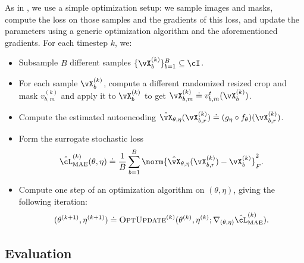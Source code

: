 \documentclass[../../book-main.tex]{subfiles}
\begin{document}
As in , we use a simple
optimization setup: we sample images and masks, compute the loss on
those samples and the gradients of this loss, and update the
parameters using a generic optimization algorithm and the
aforementioned gradients. For each timestep \(k\), we:
\begin{itemize}
\item Subsample \(B\) different samples \(\{\vX_{b}^{(k)}\}_{b =
    1}^{B} \subseteq \cI\).
\item For each sample \(\vX_{b}^{(k)}\), compute a different
    randomized resized crop and mask \(v_{b, m}^{(k)}\) and apply it
    to \(\vX_{b}^{(k)}\) to get \(\vX_{b, m}^{(k)} \doteq v_{b,
    m}^{t}(\vX_{b}^{(k)})\).
\item Compute the estimated autoencoding \(\hat{\vX}_{\theta,
        \eta}(\vX_{b, r}^{(k)}) \doteq (g_{\eta} \circ
    f_{\theta})(\vX_{b, r}^{(k)})\).
\item Form the surrogate stochastic loss
    \begin{equation}
        \hat{\cL}_{\mathrm{MAE}}^{(k)}(\theta, \eta) \doteq
        \frac{1}{B}\sum_{b = 1}^{B}\norm{\hat{\vX}_{\theta,
        \eta}(\vX_{b, r}^{(k)}) - \vX_{b}^{(k)}}_{F}^{2} .
    \end{equation}
\item Compute one step of an optimization algorithm on \((\theta,
    \eta)\), giving the following iteration:
    \begin{equation}
        (\theta^{(k + 1)}, \eta^{(k + 1)}) \doteq
        \textsc{OptUpdate}^{(k)}(\theta^{(k)}, \eta^{(k)};
        \nabla_{(\theta, \eta)}\hat{\cL}_{\mathrm{MAE}}^{(k)}) .
    \end{equation}
\end{itemize}

\subsection{Evaluation} \label{sub:image_completion_optimization_1}
\end{document}
